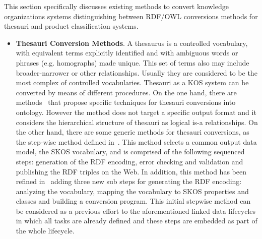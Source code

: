 This section specifically discusses existing methods to convert knowledge organizations systems distinguishing between RDF/OWL 
conversions methods for thesauri and product classification systems.

\begin{itemize}
 \item \textbf{Thesauri Conversion Methods}. A thesaurus is a controlled vocabulary, with equivalent terms explicitly 
 identified and with ambiguous words or phrases (e.g. homographs) made unique. This set of terms also may include broader-narrower 
 or other relationships. Usually they are considered to be the most complex of controlled vocabularies. Thesauri as a KOS 
 system can be converted by means of different procedures. On the one hand, there are methods~\cite{DBLP:conf/jcdl/Soergel05} that propose specific 
 techniques for thesauri conversions into ontology. However the method does not target a specific output format and it considers the 
 hierarchical structure of thesauri as logical is-a relationships. On the other hand, there are some generic methods 
 for thesauri conversions, as the step-wise method defined in~\cite{DBLP:conf/esws/AssemMMS06}. This method selects a common output data model, the 
 SKOS vocabulary, and is comprised of the following sequenced steps: generation of the RDF encoding, error checking and validation 
 and publishing the RDF triples on the Web. In addition, this method has been refined in~\cite{siedl2008} adding three new sub steps 
 for generating the RDF encoding: analyzing the vocabulary, mapping the vocabulary to SKOS properties and classes and building a conversion program. 
 This initial stepwise method can be considered as a previous effort to the aforementioned linked data lifecycles in which all tasks are already defined and these
 steps are embedded as part of the whole lifecycle.
 

\end{itemize}
